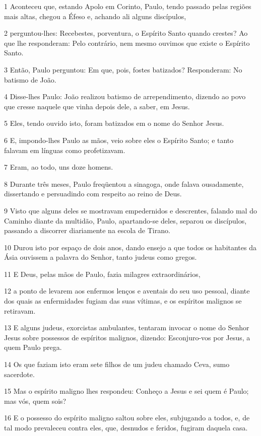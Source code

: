 \par 1 Aconteceu que, estando Apolo em Corinto, Paulo, tendo passado pelas regiões mais altas, chegou a Éfeso e, achando ali alguns discípulos,
\par 2 perguntou-lhes: Recebestes, porventura, o Espírito Santo quando crestes? Ao que lhe responderam: Pelo contrário, nem mesmo ouvimos que existe o Espírito Santo.
\par 3 Então, Paulo perguntou: Em que, pois, fostes batizados? Responderam: No batismo de João.
\par 4 Disse-lhes Paulo: João realizou batismo de arrependimento, dizendo ao povo que cresse naquele que vinha depois dele, a saber, em Jesus.
\par 5 Eles, tendo ouvido isto, foram batizados em o nome do Senhor Jesus.
\par 6 E, impondo-lhes Paulo as mãos, veio sobre eles o Espírito Santo; e tanto falavam em línguas como profetizavam.
\par 7 Eram, ao todo, uns doze homens.
\par 8 Durante três meses, Paulo freqüentou a sinagoga, onde falava ousadamente, dissertando e persuadindo com respeito ao reino de Deus.
\par 9 Visto que alguns deles se mostravam empedernidos e descrentes, falando mal do Caminho diante da multidão, Paulo, apartando-se deles, separou os discípulos, passando a discorrer diariamente na escola de Tirano.
\par 10 Durou isto por espaço de dois anos, dando ensejo a que todos os habitantes da Ásia ouvissem a palavra do Senhor, tanto judeus como gregos.
\par 11 E Deus, pelas mãos de Paulo, fazia milagres extraordinários,
\par 12 a ponto de levarem aos enfermos lenços e aventais do seu uso pessoal, diante dos quais as enfermidades fugiam das suas vítimas, e os espíritos malignos se retiravam.
\par 13 E alguns judeus, exorcistas ambulantes, tentaram invocar o nome do Senhor Jesus sobre possessos de espíritos malignos, dizendo: Esconjuro-vos por Jesus, a quem Paulo prega.
\par 14 Os que faziam isto eram sete filhos de um judeu chamado Ceva, sumo sacerdote.
\par 15 Mas o espírito maligno lhes respondeu: Conheço a Jesus e sei quem é Paulo; mas vós, quem sois?
\par 16 E o possesso do espírito maligno saltou sobre eles, subjugando a todos, e, de tal modo prevaleceu contra eles, que, desnudos e feridos, fugiram daquela casa.
